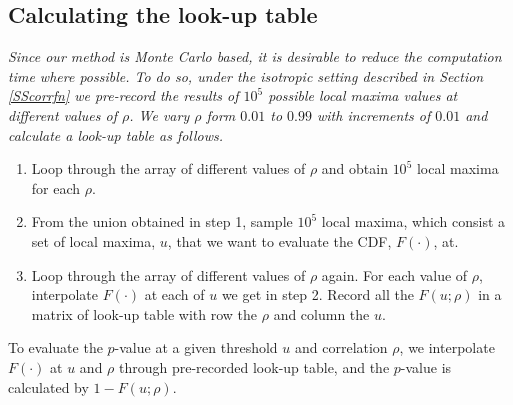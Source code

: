 \documentclass{article}
\newcommand{\nt}[1]{\textit{\color{red} #1}}
\begin{document}
\subsection{Calculating the look-up table} 
\label{appendix.d3}
\nt{Since our method is Monte Carlo based, it is desirable to reduce the computation time where possible. To do so, under the isotropic setting described in Section \ref{SScorrfn} we pre-record the results of $10^5$ possible local maxima values at different values of $\rho$. We vary $\rho$ form $0.01$ to $0.99$ with increments of $0.01$ and calculate a look-up table as follows.}
\begin{enumerate}
    \item Loop through the array of different values of $\rho$ and obtain $10^5$ local maxima for each $\rho$.
    \item From the union obtained in step 1, sample $10^5$ local maxima, which consist a set of local maxima, $u$, that we want to evaluate the CDF, $F(\cdot)$, at.
    \item Loop through the array of different values of $\rho$ again. For each value of $\rho$, interpolate $F(\cdot)$ at each of $u$ we get in step 2. Record all the $F(u;\rho)$ in a matrix of look-up table with row the $\rho$ and column the $u$.
\end{enumerate}
To evaluate the $p$-value at a given threshold $u$ and correlation $\rho$, we interpolate $F(\cdot)$ at $u$ and $\rho$ through pre-recorded look-up table, and the $p$-value is calculated by $1-F(u;\rho)$.
\end{document}
